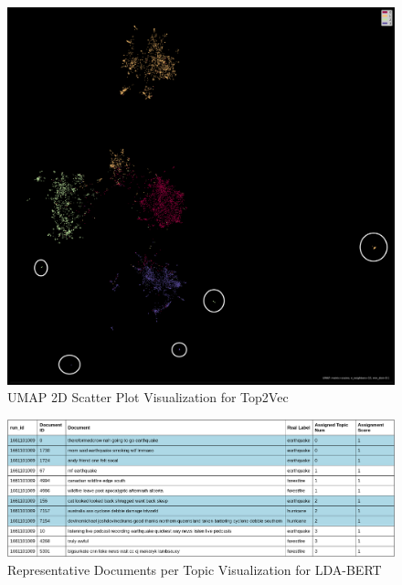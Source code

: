 \documentclass[11pt]{article}
\begin{document}
\begin{figure}[ht]
\includegraphics[width=12cm]{Figures/umap2d.png}
\centering
\caption{UMAP 2D Scatter Plot Visualization for Top2Vec}
\label{fig:umap2d}
\end{figure}

\begin{figure}[ht]
\includegraphics[width=16cm]{Figures/ldabert_get_representative_docs.png}
\centering
\caption{Representative Documents per Topic Visualization for LDA-BERT}
\label{fig:representative_docs}
\end{figure}
\end{document}
